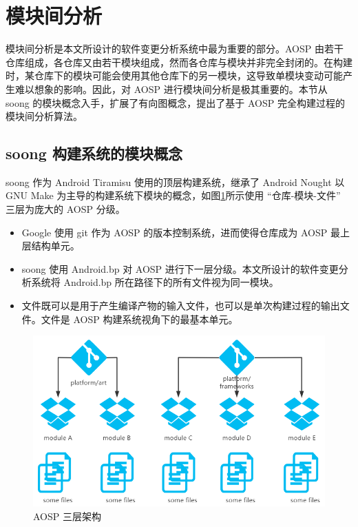 \section{模块间分析}\label{intermodule-analysis}

模块间分析是本文所设计的软件变更分析系统中最为重要的部分。AOSP 由若干仓库组成，各仓库又由若干模块组成，然而各仓库与模块并非完全封闭的。在构建时，某仓库下的模块可能会使用其他仓库下的另一模块，这导致单模块变动可能产生难以想象的影响。因此，对 AOSP 进行模块间分析是极其重要的。本节从 soong 的模块概念入手，扩展了有向图概念，提出了基于 AOSP 完全构建过程的模块间分析算法。

\subsection{soong 构建系统的模块概念}

soong 作为 Android Tiramisu 使用的顶层构建系统，继承了 Android Nought 以 GNU Make 为主导的构建系统下模块的概念，如图\ref{fig:aosp-3-layer}所示使用 “仓库-模块-文件” 三层为庞大的 AOSP 分级。

\begin{itemize}
    \item Google 使用 git 作为 AOSP 的版本控制系统，进而使得仓库成为 AOSP 最上层结构单元。
    \item soong 使用 Android.bp 对 AOSP 进行下一层分级。本文所设计的软件变更分析系统将 Android.bp 所在路径下的所有文件视为同一模块。
    \item 文件既可以是用于产生编译产物的输入文件，也可以是单次构建过程的输出文件。文件是 AOSP 构建系统视角下的最基本单元。
\end{itemize}

\begin{figure}[htb]
    \centering
    \includegraphics[width=.8\textwidth]{figures/3-layer.png}
    \caption{AOSP 三层架构}
    \label{fig:aosp-3-layer}
\end{figure}

